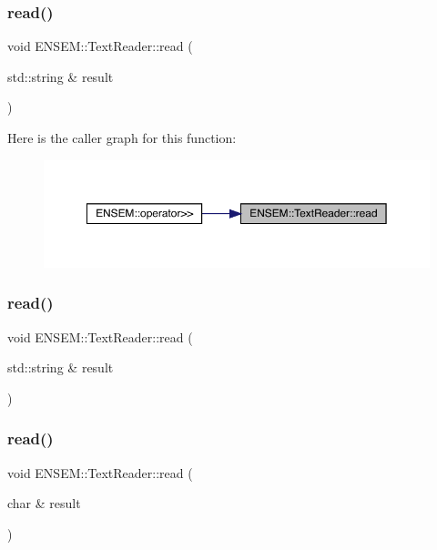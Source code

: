 \subsubsection{\texorpdfstring{read()}{read()}\hspace{0.1cm}{\footnotesize\ttfamily [2/33]}}
{\footnotesize\ttfamily void E\+N\+S\+E\+M\+::\+Text\+Reader\+::read (\begin{DoxyParamCaption}\item[{std\+::string \&}]{result }\end{DoxyParamCaption})}

Here is the caller graph for this function\+:
\nopagebreak
\begin{figure}[H]
\begin{center}
\leavevmode
\includegraphics[width=350pt]{d4/d23/classENSEM_1_1TextReader_acbeb934e3316e4cf0c74d23dbe473d19_icgraph}
\end{center}
\end{figure}
\mbox{\label{classENSEM_1_1TextReader_acbeb934e3316e4cf0c74d23dbe473d19}} 
\subsubsection{\texorpdfstring{read()}{read()}\hspace{0.1cm}{\footnotesize\ttfamily [3/33]}}
{\footnotesize\ttfamily void E\+N\+S\+E\+M\+::\+Text\+Reader\+::read (\begin{DoxyParamCaption}\item[{std\+::string \&}]{result }\end{DoxyParamCaption})}

\mbox{\label{classENSEM_1_1TextReader_acfa438667353be1fd79c0170344eefe8}} 
\subsubsection{\texorpdfstring{read()}{read()}\hspace{0.1cm}{\footnotesize\ttfamily [4/33]}}
{\footnotesize\ttfamily void E\+N\+S\+E\+M\+::\+Text\+Reader\+::read (\begin{DoxyParamCaption}\item[{char \&}]{result }\end{DoxyParamCaption})}

